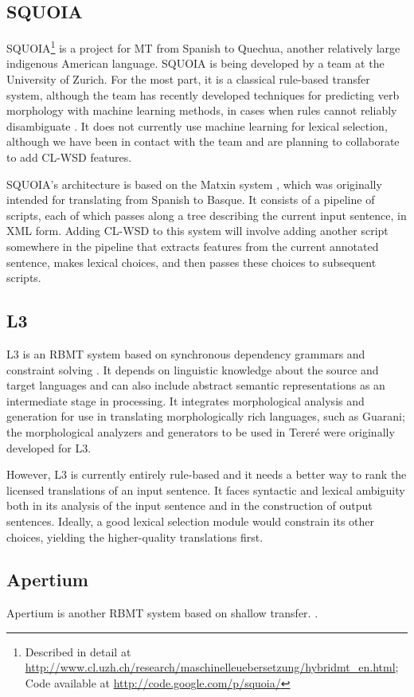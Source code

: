 \subsection{SQUOIA}
SQUOIA\footnote{Described in detail at
\url{http://www.cl.uzh.ch/research/maschinelleuebersetzung/hybridmt_en.html}; 
Code available at \url{http://code.google.com/p/squoia/}}
is a project for MT from Spanish to Quechua, another relatively large
indigenous American language. SQUOIA is being developed by a team at the
University of Zurich. For the most part, it is a classical rule-based transfer
system, although the team has recently developed techniques for predicting verb
morphology with machine learning methods, in cases when rules cannot reliably
disambiguate \cite{riosgonzales-gohring:2013:HyTra}. It does not currently use
machine learning for lexical selection, although we have been in contact with
the team and are planning to collaborate to add CL-WSD features.

SQUOIA's architecture is based on the Matxin system \cite{matxin_2005}, which
was originally intended for translating from Spanish to Basque.
It consists of a pipeline of scripts, each of which passes along a tree
describing the current input sentence, in XML form. Adding CL-WSD to this
system will involve adding another script somewhere in the pipeline that
extracts features from the current annotated sentence, makes lexical choices,
and then passes these choices to subsequent scripts.

\subsection{L3}
L3 is an RBMT system based on synchronous dependency grammars and constraint
solving \cite{gasser:sxdg,gasser:aflat2012}.
It depends on linguistic knowledge about the source and target languages and
can also include abstract semantic representations as an intermediate stage in
processing. It integrates morphological analysis and generation for use in
translating morphologically rich languages, such as Guarani;
the morphological analyzers and generators to be used in Tereré were originally
developed for L3.

However, L3 is currently entirely rule-based and it needs a better way to rank
the licensed translations of an input sentence. It faces syntactic and lexical
ambiguity both in its analysis of the input sentence and in the construction of
output sentences. Ideally, a good lexical selection module would constrain its
other choices, yielding the higher-quality translations first.

\subsection{Apertium}
Apertium is another RBMT system based on shallow transfer.
\cite{Forcada_theapertium}.


